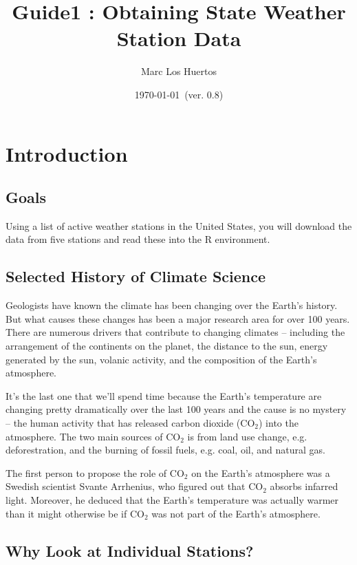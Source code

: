 \documentclass{article}\usepackage[]{graphicx}\usepackage[]{xcolor}
\title{Guide1 : Obtaining State Weather Station Data}
\author{Marc Los Huertos}
\date{\today~(ver. 0.8)}
\begin{document}
\maketitle

\section{Introduction}

\subsection{Goals}

Using a list of active weather stations in the United States, you  will download the data from five stations and read these into the R environment. 


\subsection{Selected History of Climate Science}

Geologists have known the climate has been changing over the Earth's history. But what causes these changes has been a major research area for over 100 years. There are numerous drivers that contribute to changing climates -- including the arrangement of the continents on the planet, the distance to the sun, energy generated by the sun, volanic activity, and the composition of the Earth's atmosphere. 

It's the last one that we'll spend time because the Earth's temperature are changing pretty dramatically over the last 100 years and the cause is no mystery -- the human activity that has released carbon dioxide (CO$_2$) into the atmosphere. The two main sources of CO$_2$ is from land use change, e.g. deforestration, and the burning of fossil fuels, e.g. coal, oil, and natural gas. 

The first person to propose the role of CO$_2$ on the Earth's atmosphere was a Swedish scientist Svante Arrhenius, who figured out that CO$_2$ absorbs infarred light. Moreover, he deduced that the Earth's temperature was actually warmer than it might otherwise be if CO$_2$ was not part of the Earth's atmosphere. 

\subsection{Why Look at Individual Stations?}
\end{document}
